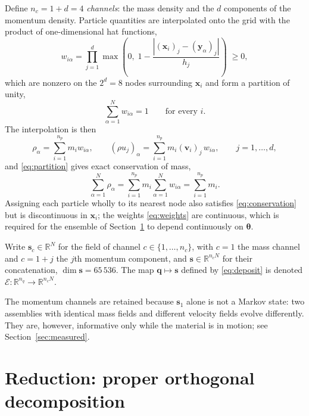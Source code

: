 \documentclass[11pt]{article}
\newcommand{\R}{\mathbb{R}}
\newcommand{\bs}[1]{\boldsymbol{#1}}
\begin{document}
Define $n_c = 1 + d = 4$ \emph{channels}: the mass density and the $d$ components of the
momentum density. Particle quantities are interpolated onto the grid with the product of
one-dimensional hat functions,
\begin{equation}
  w_{i\alpha} = \prod_{j=1}^{d} \max\!\left( 0, \; 1 -
  \frac{\left| (\bs{x}_i)_j - (\bs{y}_\alpha)_j \right|}{h_j} \right) \; \geq 0 ,
  \label{eq:weights}
\end{equation}
which are nonzero on the $2^d = 8$ nodes surrounding $\bs{x}_i$ and form a partition of
unity,
\begin{equation}
  \sum_{\alpha=1}^{N} w_{i\alpha} = 1 \qquad \text{for every } i .
  \label{eq:partition}
\end{equation}
The interpolation is then
\begin{equation}
  \rho_\alpha = \sum_{i=1}^{n_p} m_i w_{i\alpha},
  \qquad
  (\rho u_j)_\alpha = \sum_{i=1}^{n_p} m_i (\bs{v}_i)_j \, w_{i\alpha},
  \qquad j = 1, \ldots, d,
  \label{eq:deposit}
\end{equation}
and \eqref{eq:partition} gives exact conservation of mass,
\begin{equation}
  \sum_{\alpha=1}^{N} \rho_\alpha
  = \sum_{i=1}^{n_p} m_i \sum_{\alpha=1}^{N} w_{i\alpha}
  = \sum_{i=1}^{n_p} m_i .
  \label{eq:conservation}
\end{equation}
Assigning each particle wholly to its nearest node also satisfies \eqref{eq:conservation}
but is discontinuous in $\bs{x}_i$; the weights \eqref{eq:weights} are continuous, which is
required for the ensemble of Section~\ref{sec:pod} to depend continuously on
$\bs{\theta}$.

Write $\bs{s}_c \in \R^{N}$ for the field of channel $c \in \{1, \ldots, n_c\}$, with
$c = 1$ the mass channel and $c = 1 + j$ the $j$th momentum component, and
$\bs{s} \in \R^{n_c N}$ for their concatenation, $\dim \bs{s} = 65\,536$. The map
$\bs{q} \mapsto \bs{s}$ defined by \eqref{eq:deposit} is denoted
$\mathcal{E} : \R^{n_q} \to \R^{n_c N}$.

The momentum channels are retained because $\bs{s}_1$ alone is not a Markov state: two
assemblies with identical mass fields and different velocity fields evolve differently.
They are, however, informative only while the material is in motion; see
Section~\ref{sec:measured}.

\section{Reduction: proper orthogonal decomposition}
\label{sec:pod}
\end{document}

